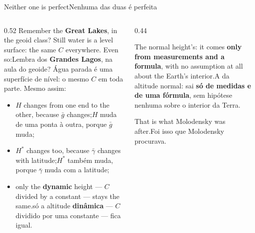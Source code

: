 \documentclass[aspectratio=169,11pt]{beamer}
\newcommand{\tr}[2]{\ifEN#2\else#1\fi}
\newcommand{\bnum}[1]{\textbf{\textcolor{mTeal}{#1}}}
\begin{document}
\begin{frame}{\tr{Nenhuma das duas é perfeita}{Neither one is perfect}}
  \begin{columns}[T]
    \begin{column}{0.52\textwidth}
      \tr{Lembra dos \bnum{Grandes Lagos}, na aula do geoide? Água parada é uma superfície de
      nível: o mesmo $C$ em toda parte. Mesmo assim:}{Remember the \bnum{Great Lakes}, in the
      geoid class? Still water is a level surface: the same $C$ everywhere. Even so:}
      \begin{itemize}
        \setlength{\itemsep}{4pt}
        \item \tr{$H$ muda de uma ponta à outra, porque $\bar g$ muda;}{$H$ changes from one end
              to the other, because $\bar g$ changes;}
        \item \tr{$H^{*}$ também muda, porque $\bar\gamma$ muda com a latitude;}{$H^{*}$ changes
              too, because $\bar\gamma$ changes with latitude;}
        \item \tr{só a altitude \bnum{dinâmica} --- $C$ dividido por uma constante --- fica
              igual.}{only the \bnum{dynamic} height --- $C$ divided by a constant --- stays
              the same.}
      \end{itemize}
    \end{column}
    \begin{column}{0.44\textwidth}
      \begin{ideia}[title={\tr{Cada altura tem a sua vantagem}{Each height has its advantage}}]
        \tr{A da altitude normal: sai \bnum{só de medidas e de uma fórmula}, sem hipótese
        nenhuma sobre o interior da Terra.}{The normal height's: it comes \bnum{only from
        measurements and a formula}, with no assumption at all about the Earth's interior.}
        \medskip

        \tr{Foi isso que Molodensky procurava.}{That is what Molodensky was after.}
      \end{ideia}
    \end{column}
  \end{columns}
\end{frame}
\end{document}

